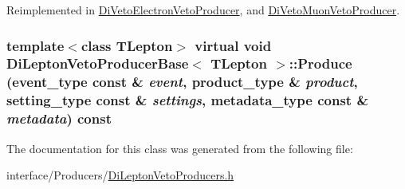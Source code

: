 Reimplemented in \hyperlink{classDiVetoElectronVetoProducer_ac741e779b47951598f628b190d883eda}{DiVetoElectronVetoProducer}, and \hyperlink{classDiVetoMuonVetoProducer_a094b025b9686518c03836d57fcf943ac}{DiVetoMuonVetoProducer}.\hypertarget{classDiLeptonVetoProducerBase_a6b137689f07f8129c0c20be36b19e0b3}{
\subsubsection[{Produce}]{\setlength{\rightskip}{0pt plus 5cm}template$<$class TLepton$>$ virtual void {\bf DiLeptonVetoProducerBase}$<$ TLepton $>$::Produce (event\_\-type const \& {\em event}, \/  product\_\-type \& {\em product}, \/  setting\_\-type const \& {\em settings}, \/  metadata\_\-type const \& {\em metadata}) const}}
\label{classDiLeptonVetoProducerBase_a6b137689f07f8129c0c20be36b19e0b3}


The documentation for this class was generated from the following file:\begin{DoxyCompactItemize}
\item 
interface/Producers/\hyperlink{DiLeptonVetoProducers_8h}{DiLeptonVetoProducers.h}\end{DoxyCompactItemize}
